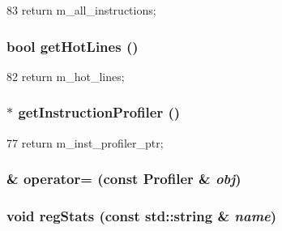 \begin{DoxyCode}
83 { return m_all_instructions; }
\end{DoxyCode}
\hypertarget{classProfiler_a51d84ccca8b5f090c1f01ce24d53895c}{
\subsubsection[{getHotLines}]{\setlength{\rightskip}{0pt plus 5cm}bool getHotLines ()}}
\label{classProfiler_a51d84ccca8b5f090c1f01ce24d53895c}



\begin{DoxyCode}
82 { return m_hot_lines; }
\end{DoxyCode}
\hypertarget{classProfiler_a5dc719d0d14855b6886f05bf4f1806e2}{
\subsubsection[{getInstructionProfiler}]{$\ast$ getInstructionProfiler ()}}
\label{classProfiler_a5dc719d0d14855b6886f05bf4f1806e2}



\begin{DoxyCode}
77 { return m_inst_profiler_ptr; }
\end{DoxyCode}
\hypertarget{classProfiler_a60b8f0ed1eda481bdc0c0652cb27a7bf}{
\subsubsection[{operator=}]{\& operator= (const {\bf Profiler} \& {\em obj})}}
\label{classProfiler_a60b8f0ed1eda481bdc0c0652cb27a7bf}
\hypertarget{classProfiler_a3dd3443357312bcb75580eaa508c48a4}{
\subsubsection[{regStats}]{\setlength{\rightskip}{0pt plus 5cm}void regStats (const std::string \& {\em name})}}
\label{classProfiler_a3dd3443357312bcb75580eaa508c48a4}



